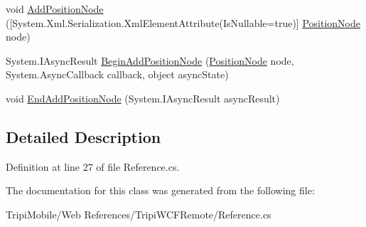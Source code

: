 \begin{DoxyCompactItemize}
\begin{DoxyCompactList}\small\item\em \item\end{DoxyCompactList}\item 
\hypertarget{class_tripi_1_1_tripi_w_c_f_remote_1_1_tripi_silverlight_w_c_f_service_a8a98fe7f8761171476b000bfeb68242a}{
void \hyperlink{class_tripi_1_1_tripi_w_c_f_remote_1_1_tripi_silverlight_w_c_f_service_a8a98fe7f8761171476b000bfeb68242a}{AddPositionNode} (\mbox{[}System.Xml.Serialization.XmlElementAttribute(IsNullable=true)\mbox{]} \hyperlink{class_tripi_1_1_tripi_w_c_f_remote_1_1_position_node}{PositionNode} node)}
\label{class_tripi_1_1_tripi_w_c_f_remote_1_1_tripi_silverlight_w_c_f_service_a8a98fe7f8761171476b000bfeb68242a}

\begin{DoxyCompactList}\small\item\em \item\end{DoxyCompactList}\item 
\hypertarget{class_tripi_1_1_tripi_w_c_f_remote_1_1_tripi_silverlight_w_c_f_service_a4fdc503dd2834832b80c6fc1d6184487}{
System.IAsyncResult \hyperlink{class_tripi_1_1_tripi_w_c_f_remote_1_1_tripi_silverlight_w_c_f_service_a4fdc503dd2834832b80c6fc1d6184487}{BeginAddPositionNode} (\hyperlink{class_tripi_1_1_tripi_w_c_f_remote_1_1_position_node}{PositionNode} node, System.AsyncCallback callback, object asyncState)}
\label{class_tripi_1_1_tripi_w_c_f_remote_1_1_tripi_silverlight_w_c_f_service_a4fdc503dd2834832b80c6fc1d6184487}

\begin{DoxyCompactList}\small\item\em \item\end{DoxyCompactList}\item 
\hypertarget{class_tripi_1_1_tripi_w_c_f_remote_1_1_tripi_silverlight_w_c_f_service_ab96bfd02b04396bfc0cc524a2a66ef73}{
void \hyperlink{class_tripi_1_1_tripi_w_c_f_remote_1_1_tripi_silverlight_w_c_f_service_ab96bfd02b04396bfc0cc524a2a66ef73}{EndAddPositionNode} (System.IAsyncResult asyncResult)}
\label{class_tripi_1_1_tripi_w_c_f_remote_1_1_tripi_silverlight_w_c_f_service_ab96bfd02b04396bfc0cc524a2a66ef73}

\begin{DoxyCompactList}\small\item\em \item\end{DoxyCompactList}\end{DoxyCompactItemize}


\subsection{Detailed Description}


Definition at line 27 of file Reference.cs.

The documentation for this class was generated from the following file:\begin{DoxyCompactItemize}
\item 
TripiMobile/Web References/TripiWCFRemote/Reference.cs\end{DoxyCompactItemize}
